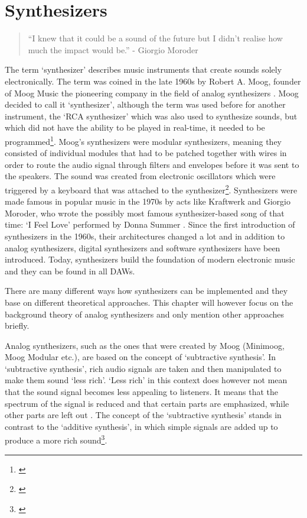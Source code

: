 \section{Synthesizers}
\label{sec:webaudio-synth}
\begin{quote}
  ``I knew that it could be a sound of the future but I didn't realise how much the impact would be.'' - Giorgio Moroder
\end{quote}

The term `synthesizer' describes music instruments that create sounds solely electronically. The term was coined in the late 1960s by Robert A. Moog, founder of Moog Music the pioneering company in the field of analog synthesizers \cite[p. 67]{pinch2004analog}. Moog decided to call it `synthesizer', although the term was used before for another instrument, the `RCA synthesizer' which was also used to synthesize sounds, but which did not have the ability to be played in real-time, it needed to be programmed\footnote{\cite[p. 67]{pinch2004analog}}. Moog's synthesizers were modular synthesizers, meaning they consisted of individual modules that had to be patched together with wires in order to route the audio signal through filters and envelopes before it was sent to the speakers. The sound was created from electronic oscillators which were triggered by a keyboard that was attached to the synthesizer\footnote{\cite[p. 25ff]{pinch2004analog}}. Synthesizers were made famous in popular music in the 1970s by acts like Kraftwerk and Giorgio Moroder, who wrote the possibly most famous synthesizer-based song of that time: `I Feel Love' performed by Donna Summer \cite[14:37min]{bbc2009synthbritannia}. Since the first introduction of synthesizers in the 1960s, their architectures changed a lot and in addition to analog synthesizers, digital synthesizers and software synthesizers have been introduced. Today, synthesizers build the foundation of modern electronic music and they can be found in all DAWs.

There are many different ways how synthesizers can be implemented and they base on different theoretical approaches. This chapter will however focus on the background theory of analog synthesizers and only mention other approaches briefly.

Analog synthesizers, such as the ones that were created by Moog (Minimoog, Moog Modular etc.), are based on the concept of `subtractive synthesis'. In `subtractive synthesis', rich audio signals are taken and then manipulated to make them sound `less rich'. `Less rich' in this context does however not mean that the sound signal becomes less appealing to listeners. It means that the spectrum of the signal is reduced and that certain parts are emphasized, while other parts are left out \cite[p. 223f]{park2009introductionto}. The concept of the `subtractive synthesis' stands in contrast to the `additive synthesis', in which simple signals are added up to produce a more rich sound\footnote{\cite[p. 277f]{park2009introductionto}}.

